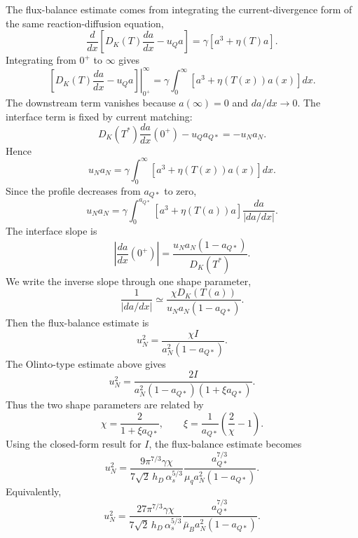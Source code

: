 The flux-balance estimate comes from integrating the current-divergence form of
the same reaction-diffusion equation,
\begin{equation}
\frac{d}{dx}
\left[
D_K(T)\frac{da}{dx}-u_Qa
\right]
=
\gamma\left[a^3+\eta(T)a\right].
\end{equation}
Integrating from \(0^+\) to \(\infty\) gives
\begin{equation}
\left.
\left[
D_K(T)\frac{da}{dx}-u_Qa
\right]\right|_{0^+}^{\infty}
=
\gamma\int_0^\infty
\left[a^3+\eta(T(x))a(x)\right]dx .
\end{equation}
The downstream term vanishes because \(a(\infty)=0\) and \(da/dx\to0\).
The interface term is fixed by current matching:
\begin{equation}
D_K(T^*)\frac{da}{dx}(0^+)-u_Qa_{Q*}=-u_Na_N .
\end{equation}
Hence
\begin{equation}
u_Na_N
=
\gamma\int_0^\infty
\left[a^3+\eta(T(x))a(x)\right]dx .
\end{equation}
Since the profile decreases from \(a_{Q*}\) to zero,
\begin{equation}
u_Na_N
=
\gamma
\int_0^{a_{Q*}}
\left[a^3+\eta(T(a))a\right]\frac{da}{|da/dx|}.
\end{equation}
The interface slope is
\begin{equation}
\left|\frac{da}{dx}(0^+)\right|
=
\frac{u_Na_N(1-a_{Q*})}{D_K(T^*)}.
\end{equation}
We write the inverse slope through one shape parameter,
\begin{equation}
\frac{1}{|da/dx|}
\simeq
\frac{\chi D_K(T(a))}{u_Na_N(1-a_{Q*})}.
\end{equation}
Then the flux-balance estimate is
\begin{equation}
u_N^2
=
\frac{\chi I}{a_N^2(1-a_{Q*})}.
\end{equation}
The Olinto-type estimate above gives
\begin{equation}
u_N^2
=
\frac{2I}
{a_N^2(1-a_{Q*})(1+\xi a_{Q*})}.
\end{equation}
Thus the two shape parameters are related by
\begin{equation}
\chi=\frac{2}{1+\xi a_{Q*}},
\qquad
\xi=\frac{1}{a_{Q*}}\left(\frac{2}{\chi}-1\right).
\end{equation}
Using the closed-form result for \(I\), the flux-balance estimate becomes
\begin{equation}
u_N^2
=
\frac{
9\pi^{7/3}\gamma\chi
}{
7\sqrt{2}\,h_D\,\alpha_s^{5/3}
}
\frac{
a_{Q*}^{7/3}
}{
\mu_q a_N^2(1-a_{Q*})
}.
\end{equation}
Equivalently,
\begin{equation}
u_N^2
=
\frac{
27\pi^{7/3}\gamma\chi
}{
7\sqrt{2}\,h_D\,\alpha_s^{5/3}
}
\frac{
a_{Q*}^{7/3}
}{
\bar\mu_B a_N^2(1-a_{Q*})
}.
\end{equation}
